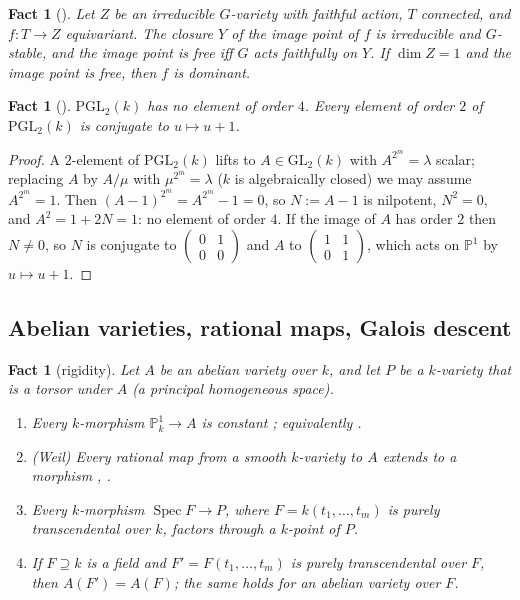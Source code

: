 \documentclass[11pt]{amsart}
\newtheorem{fact}[theorem]{Fact}
\theoremstyle{definition}
\theoremstyle{remark}
\newcommand{\PP}{\mathbb P}
\newcommand{\Spec}{\operatorname{Spec}}
\begin{document}
\begin{fact}[{\cite[Lemma 2.4]{P}}]\label{fact:image}
Let $Z$ be an irreducible $G$-variety with faithful action, $T$ connected, and
$f\colon T\to Z$ equivariant. The closure $Y$ of the image point of $f$ is irreducible and
$G$-stable, and the image point is free iff $G$ acts faithfully on $Y$. If $\dim Z=1$
and the image point is free, then $f$ is dominant.
\end{fact}

\begin{fact}[{\cite[Lemma 2.5(ii)]{P}}]\label{fact:pgl}
$\mathrm{PGL}_2(k)$ has no element of order $4$. Every element of order $2$ of
$\mathrm{PGL}_2(k)$ is conjugate to $u\mapsto u+1$.
\end{fact}

\begin{proof}
A $2$-element of $\mathrm{PGL}_2(k)$ lifts to $A\in\mathrm{GL}_2(k)$ with $A^{2^m}=\lambda$
scalar; replacing $A$ by $A/\mu$ with $\mu^{2^m}=\lambda$ ($k$ is algebraically closed) we
may assume $A^{2^m}=1$.
Then $(A-1)^{2^m}=A^{2^m}-1=0$, so $N:=A-1$ is nilpotent, $N^2=0$, and
$A^2=1+2N=1$: no element of order $4$. If the image of $A$ has order $2$ then $N\ne0$,
so $N$ is conjugate to $\left(\begin{smallmatrix}0&1\\0&0\end{smallmatrix}\right)$ and $A$
to $\left(\begin{smallmatrix}1&1\\0&1\end{smallmatrix}\right)$, which acts on $\PP^1$ by
$u\mapsto u+1$.
\end{proof}

\subsection{Abelian varieties, rational maps, Galois descent}

\begin{fact}[rigidity]\label{fact:rigid}
Let $A$ be an abelian variety over $k$, and let $P$ be a $k$-variety that is a torsor
under $A$ (a principal homogeneous space).
\begin{enumerate}[label=\textup{(\alph*)}]
\item Every $k$-morphism $\PP^1_k\to A$ is constant \cite[Cor.~3.8]{Mi}; equivalently
\cite[Lemma 2.5(iv)]{P}.
\item (Weil) Every rational map from a smooth $k$-variety to $A$ extends to a morphism
\cite[Thm.~3.1]{Mi}, \cite[8.4, Cor.~6]{BLR}.
\item Every $k$-morphism $\Spec F\to P$, where $F=k(t_1,\dots,t_m)$ is purely
transcendental over $k$, factors through a $k$-point of $P$.
\item \cite[Lemma 4.1(ii)]{P} If $F\supseteq k$ is a field and $F'=F(t_1,\dots,t_m)$ is
purely transcendental over $F$, then $A(F')=A(F)$; the same holds for an abelian variety
over $F$.
\end{enumerate}
\end{fact}
\end{document}
